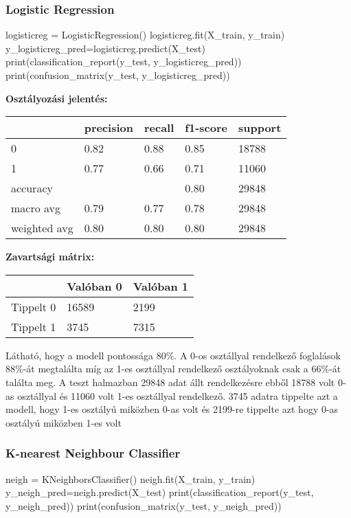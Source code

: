 \subsubsection{Logistic Regression}
\begin{python}
logisticreg = LogisticRegression()
logisticreg.fit(X_train, y_train)
y_logisticreg_pred=logisticreg.predict(X_test)
print(classification_report(y_test, y_logisticreg_pred))
print(confusion_matrix(y_test, y_logisticreg_pred))
\end{python}

\textbf{Osztályozási jelentés:}

\begin{tabular}{|l|l|l|l|l|}
\hline
             & precision & recall & f1-score & support \\
             \hline
0            & 0.82      & 0.88   & 0.85     & 18788   \\
\hline
1            & 0.77      & 0.66   & 0.71     & 11060   \\
\hline
accuracy     &           &        & 0.80     & 29848   \\
\hline
macro avg    & 0.79      & 0.77   & 0.78     & 29848   \\
\hline
weighted avg & 0.80      & 0.80   & 0.80     & 29848  \\
\hline
\end{tabular}

\textbf{Zavartsági mátrix:}

\begin{tabular}{|l|l|l|}
\hline
          & Valóban 0 & Valóban 1 \\
          \hline
Tippelt 0 & 16589     & 2199      \\
\hline
Tippelt 1 & 3745      & 7315   \\
\hline
\end{tabular}

Látható, hogy a modell pontossága 80\%. A 0-os osztállyal rendelkező foglalások 88\%-át megtalálta míg az 1-es osztállyal rendelkező osztályoknak csak a 66\%-át találta meg. A teszt halmazban 29848 adat állt rendelkezésre ebből 18788 volt 0-as osztállyal és 11060 volt 1-es osztállyal rendelkező. 3745 adatra tippelte azt a modell, hogy 1-es osztályú miközben 0-as volt és 2199-re tippelte azt hogy 0-as osztályú miközben 1-es volt

\subsubsection{K-nearest Neighbour Classifier}
\begin{python}
neigh = KNeighborsClassifier()
neigh.fit(X_train, y_train)
y_neigh_pred=neigh.predict(X_test)
print(classification_report(y_test, y_neigh_pred))
print(confusion_matrix(y_test, y_neigh_pred))
\end{python}

